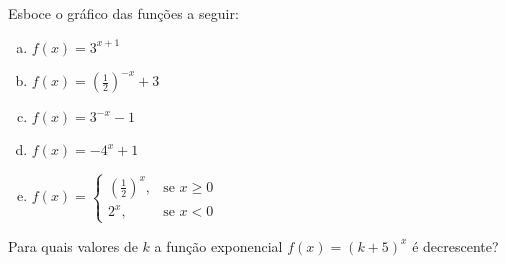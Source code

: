 
  \newpage
\begin{secExercicios}

\begin{exer}
    Esboce o gráfico das funções a seguir:
    \begin{enumerate}[a)]
        \item $f(x)=3^{x+1}$
        \item $f(x)=(\frac{1}{2})^{-x}+3$
        \item $f(x)=3^{-x}-1$
        \item $f(x)=-4^x+1$
        \item $f(x)=
        \left\{
        \begin{matrix}
            (\frac{1}{2})^x, & \mbox{se } x\geq 0\\
            2^x, & \mbox{se } x<0          
        \end{matrix}
        \right.$
    \end{enumerate}
\end{exer}

\begin{exer}
    Para quais valores de $k$ a função exponencial $f(x)=(k+5)^x$ é decrescente?
\end{exer}


\end{secExercicios}
